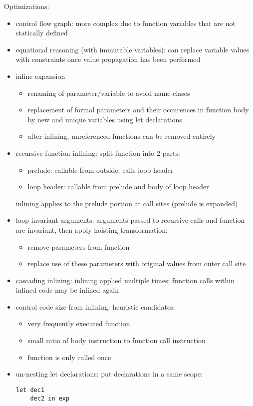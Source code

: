 \documentclass[8pt]{extarticle}
\begin{document}
\begin{multicols*}{2}
  Optimizations:
  \begin{itemize}
  \item control flow graph: more complex due to function variables that are not statically defined
  \item equational reasoning (with immutable variables): can replace variable values with constraints once value propagation has been performed
  \item inline expansion
    \begin{itemize}
    \item renaming of parameter/variable to avoid name clases
    \item replacement of formal parameters and their occurences in function body by new and unique variables using let declarations
    \item after inlining, unreferenced functions can be removed entirely
    \end{itemize}
  \item recursive function inlining: split function into 2 parts:
    \begin{itemize}
    \item prelude: callable from outside; calls loop header
    \item loop header: callable from prelude and body of loop header
    \end{itemize}
    inlining applies to the prelude portion at call sites (prelude is expanded)
  \item loop invariant arguments: arguments passed to recursive calls and function are invariant, then apply hoisting transformation:
    \begin{itemize}
    \item remove parameters from function
    \item replace use of these parameters with original values from outer call site
    \end{itemize}
  \item cascading inlining: inlining applied multiple times: function calls within inlined code  may be inlined again
  \item control code size from inlining: heuristic candidates:
    \begin{itemize}
    \item very frequently executed function
    \item small ratio of body instruction to function call instruction
    \item function is only called once
    \end{itemize}
  \item un-nesting let declarations: put declarations in a same scope:    
\begin{verbatim}
let dec1
    dec2 in exp
\end{verbatim}
  \end{itemize}


\end{multicols*}
\end{document}
